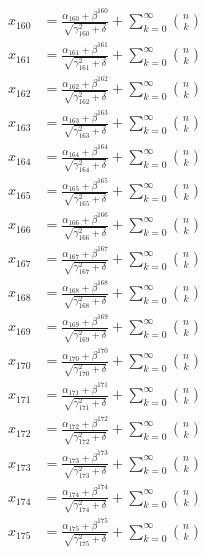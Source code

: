 \documentclass{article}
\begin{document}
\begin{align}
  x_{160} &= \frac{\alpha_{160} + \beta^{160}}{\sqrt{\gamma_{160}^2 + \delta}} + \sum_{k=0}^{\infty} \binom{n}{k} \label{eq:160} \\
  x_{161} &= \frac{\alpha_{161} + \beta^{161}}{\sqrt{\gamma_{161}^2 + \delta}} + \sum_{k=0}^{\infty} \binom{n}{k} \label{eq:161} \\
  x_{162} &= \frac{\alpha_{162} + \beta^{162}}{\sqrt{\gamma_{162}^2 + \delta}} + \sum_{k=0}^{\infty} \binom{n}{k} \label{eq:162} \\
  x_{163} &= \frac{\alpha_{163} + \beta^{163}}{\sqrt{\gamma_{163}^2 + \delta}} + \sum_{k=0}^{\infty} \binom{n}{k} \label{eq:163} \\
  x_{164} &= \frac{\alpha_{164} + \beta^{164}}{\sqrt{\gamma_{164}^2 + \delta}} + \sum_{k=0}^{\infty} \binom{n}{k} \label{eq:164} \\
  x_{165} &= \frac{\alpha_{165} + \beta^{165}}{\sqrt{\gamma_{165}^2 + \delta}} + \sum_{k=0}^{\infty} \binom{n}{k} \label{eq:165} \\
  x_{166} &= \frac{\alpha_{166} + \beta^{166}}{\sqrt{\gamma_{166}^2 + \delta}} + \sum_{k=0}^{\infty} \binom{n}{k} \label{eq:166} \\
  x_{167} &= \frac{\alpha_{167} + \beta^{167}}{\sqrt{\gamma_{167}^2 + \delta}} + \sum_{k=0}^{\infty} \binom{n}{k} \label{eq:167} \\
  x_{168} &= \frac{\alpha_{168} + \beta^{168}}{\sqrt{\gamma_{168}^2 + \delta}} + \sum_{k=0}^{\infty} \binom{n}{k} \label{eq:168} \\
  x_{169} &= \frac{\alpha_{169} + \beta^{169}}{\sqrt{\gamma_{169}^2 + \delta}} + \sum_{k=0}^{\infty} \binom{n}{k} \label{eq:169} \\
  x_{170} &= \frac{\alpha_{170} + \beta^{170}}{\sqrt{\gamma_{170}^2 + \delta}} + \sum_{k=0}^{\infty} \binom{n}{k} \label{eq:170} \\
  x_{171} &= \frac{\alpha_{171} + \beta^{171}}{\sqrt{\gamma_{171}^2 + \delta}} + \sum_{k=0}^{\infty} \binom{n}{k} \label{eq:171} \\
  x_{172} &= \frac{\alpha_{172} + \beta^{172}}{\sqrt{\gamma_{172}^2 + \delta}} + \sum_{k=0}^{\infty} \binom{n}{k} \label{eq:172} \\
  x_{173} &= \frac{\alpha_{173} + \beta^{173}}{\sqrt{\gamma_{173}^2 + \delta}} + \sum_{k=0}^{\infty} \binom{n}{k} \label{eq:173} \\
  x_{174} &= \frac{\alpha_{174} + \beta^{174}}{\sqrt{\gamma_{174}^2 + \delta}} + \sum_{k=0}^{\infty} \binom{n}{k} \label{eq:174} \\
  x_{175} &= \frac{\alpha_{175} + \beta^{175}}{\sqrt{\gamma_{175}^2 + \delta}} + \sum_{k=0}^{\infty} \binom{n}{k} \label{eq:175} \\

\end{align}
\end{document}
